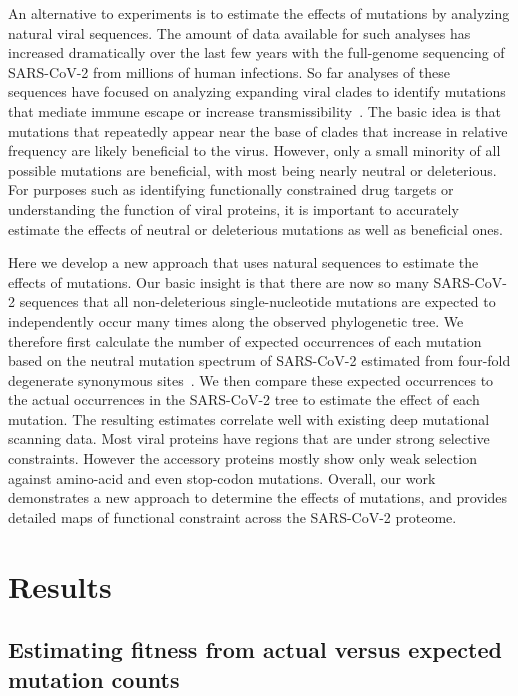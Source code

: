 \documentclass[9pt,twocolumn,twoside]{gsajnl_modified}
\newcommand\jdbcomment[1]{\textcolor{red}{[#1]}}
\begin{document}
An alternative to experiments is to estimate the effects of mutations by analyzing natural viral sequences.
The amount of data available for such analyses has increased dramatically over the last few years with the full-genome sequencing of SARS-CoV-2 from millions of human infections.
So far analyses of these sequences have focused on analyzing expanding viral clades to identify mutations that mediate immune escape or increase transmissibility~\citep{obermeyer2022analysis,lee2022inferring,maher2022predicting}.
The basic idea is that mutations that repeatedly appear near the base of clades that increase in relative frequency are likely beneficial to the virus.
However, only a small minority of all possible mutations are beneficial, with most being nearly neutral or deleterious.
For purposes such as identifying functionally constrained drug targets or understanding the function of viral proteins, it is important to accurately estimate the effects of neutral or deleterious mutations as well as beneficial ones.

Here we develop a new approach that uses natural sequences to estimate the effects of mutations.
Our basic insight is that there are now so many SARS-CoV-2 sequences that all non-deleterious single-nucleotide mutations are expected to independently occur many times along the observed phylogenetic tree.
We therefore first calculate the number of expected occurrences of each mutation based on the neutral mutation spectrum of SARS-CoV-2 estimated from four-fold degenerate synonymous sites~\citep{bloom2022evolution}.
We then compare these expected occurrences to the actual occurrences in the SARS-CoV-2 tree to estimate the effect of each mutation.
The resulting estimates correlate well with existing deep mutational scanning data.
Most viral proteins have regions that are under strong selective constraints.
However the accessory proteins mostly show only weak selection against amino-acid and even stop-codon mutations.
Overall, our work demonstrates a new approach to determine the effects of mutations, and provides detailed maps of functional constraint across the SARS-CoV-2 proteome.

\section{Results}

\subsection{Estimating fitness from actual versus expected mutation counts}
\end{document}

